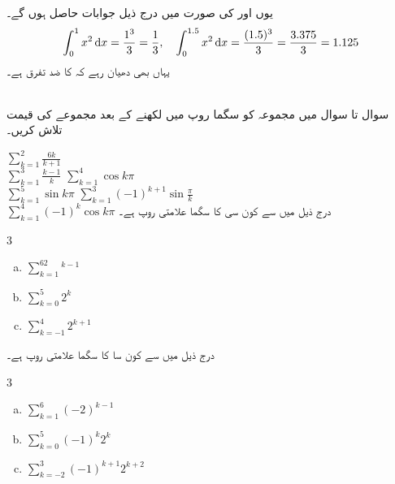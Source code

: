 یوں  اور  کی صورت میں درج ذیل جوابات حاصل ہوں گے۔
\begin{align*}
\int_0^1x^2\dif x=\frac{1^3}{3}=\frac{1}{3},\quad \int_0^{1.5}x^2\dif x=\frac{(1.5)^3}{3}=\frac{3.375}{3}=1.125
\end{align*}
یہاں بھی دھیان رہے کہ  کا ضد تفرق  ہے۔


 

\\
سوال  تا سوال  میں مجموعہ کو سگما روپ میں لکھنے کے بعد  مجموعے  کی قیمت تلاش کریں۔

$\sum\limits_{k=1}^2\tfrac{6k}{k+1}$\\
$\sum\limits_{k=1}^3\tfrac{k-1}{k}$
$\sum\limits_{k=1}^4\cos k\pi$\\
$\sum\limits_{k=1}^5\sin k\pi$
$\sum\limits_{k=1}^3(-1)^{k+1}\sin\tfrac{\pi}{k}$\\
$\sum\limits_{k=1}^4 (-1)^k\cos k\pi$
درج ذیل میں سے کون سی  کا  سگما علامتی روپ ہے۔
\begin{multicols}{3}
\begin{enumerate}[a.]
\item
$\sum\limits_{k=1}^62^{k-1}$
\item
$\sum\limits_{k=0}^5 2^k$
\item
$\sum\limits_{k=-1}^4 2^{k+1}$
\end{enumerate}
\end{multicols}
درج ذیل میں سے کون سا   کا سگما علامتی روپ ہے۔
\begin{multicols}{3}
\begin{enumerate}[a.]
\item
$\sum\limits_{k=1}^6(-2)^{k-1}$\\
\item
$\sum\limits_{k=0}^5 (-1)^k2^k$
\item
$\sum\limits_{k=-2}^3 (-1)^{k+1}2^{k+2}$
\end{enumerate}
\end{multicols}
